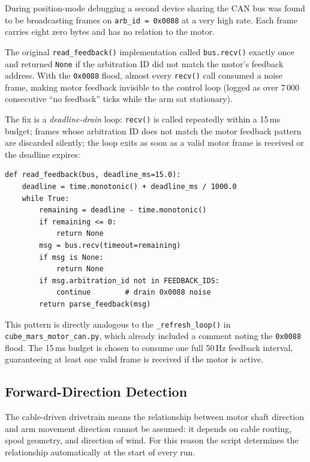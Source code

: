 \documentclass[12pt,a4paper]{article}
\begin{document}
During position-mode debugging a second device sharing the CAN bus was
found to be broadcasting frames on \texttt{arb\_id = 0x0088} at a very
high rate.  Each frame carries eight zero bytes and has no relation to
the motor.

The original \texttt{read\_feedback()} implementation called
\texttt{bus.recv()} exactly once and returned \texttt{None} if the
arbitration ID did not match the motor's feedback address.  With the
\texttt{0x0088} flood, almost every \texttt{recv()} call consumed a
noise frame, making motor feedback invisible to the control loop (logged
as over 7\,000 consecutive ``no feedback'' ticks while the arm sat
stationary).

The fix is a \emph{deadline-drain} loop: \texttt{recv()} is called
repeatedly within a 15\,ms budget; frames whose arbitration ID does not
match the motor feedback pattern are discarded silently; the loop exits
as soon as a valid motor frame is received or the deadline expires:

\begin{verbatim}
def read_feedback(bus, deadline_ms=15.0):
    deadline = time.monotonic() + deadline_ms / 1000.0
    while True:
        remaining = deadline - time.monotonic()
        if remaining <= 0:
            return None
        msg = bus.recv(timeout=remaining)
        if msg is None:
            return None
        if msg.arbitration_id not in FEEDBACK_IDS:
            continue        # drain 0x0088 noise
        return parse_feedback(msg)
\end{verbatim}

This pattern is directly analogous to the \texttt{\_refresh\_loop()} in
\texttt{cube\_mars\_motor\_can.py}, which already included a comment
noting the \texttt{0x0088} flood.  The 15\,ms budget is chosen to
consume one full 50\,Hz feedback interval, guaranteeing at least one
valid frame is received if the motor is active.

\subsection{Forward-Direction Detection}
\label{sec:detect_fw_dir}

The cable-driven drivetrain means the relationship between motor shaft
direction and arm movement direction cannot be assumed: it depends on
cable routing, spool geometry, and direction of wind.  For this reason
the script determines the relationship automatically at the start of
every run.
\end{document}
